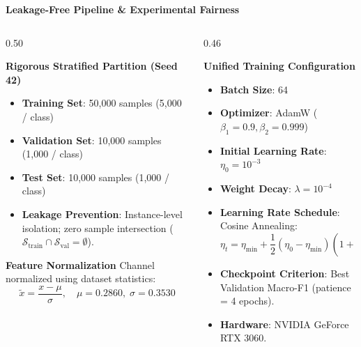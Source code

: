 \documentclass[aspectratio=169, 10pt]{beamer}
\begin{document}
\begin{frame}{\textbf{Leakage-Free Pipeline \& Experimental Fairness}}
  \begin{columns}[c]
    \begin{column}{0.50\textwidth}
      \begin{block}{\textbf{Rigorous Stratified Partition (Seed 42)}}
        \begin{itemize}\scriptsize
          \item \textbf{Training Set}: 50,000 samples (5,000 / class)
          \item \textbf{Validation Set}: 10,000 samples (1,000 / class)
          \item \textbf{Test Set}: 10,000 samples (1,000 / class)
          \item \textbf{Leakage Prevention}: Instance-level isolation; zero sample intersection ($\mathcal{S}_{\text{train}} \cap \mathcal{S}_{\text{val}} = \emptyset$).
        \end{itemize}
      \end{block}
      \vspace{0.3em}
      \begin{block}{\textbf{Feature Normalization}}
        \scriptsize
        Channel normalized using dataset statistics:
        $$\tilde{x} = \frac{x - \mu}{\sigma}, \quad \mu = 0.2860, \; \sigma = 0.3530$$
      \end{block}
    \end{column}
    \begin{column}{0.46\textwidth}
      \begin{block}{\textbf{Unified Training Configuration}}
        \begin{itemize}\scriptsize
          \item \textbf{Batch Size}: 64
          \item \textbf{Optimizer}: AdamW ($\beta_1=0.9, \beta_2=0.999$)
          \item \textbf{Initial Learning Rate}: $\eta_0 = 10^{-3}$
          \item \textbf{Weight Decay}: $\lambda = 10^{-4}$
          \item \textbf{Learning Rate Schedule}: Cosine Annealing:
          $$\eta_t = \eta_{\min} + \frac{1}{2}(\eta_0 - \eta_{\min})\left(1 + \cos\frac{\pi t}{T_{\max}}\right)$$
          \item \textbf{Checkpoint Criterion}: Best Validation Macro-F1 (patience = 4 epochs).
          \item \textbf{Hardware}: NVIDIA GeForce RTX 3060.
        \end{itemize}
      \end{block}
    \end{column}
  \end{columns}
\end{frame}
\end{document}

